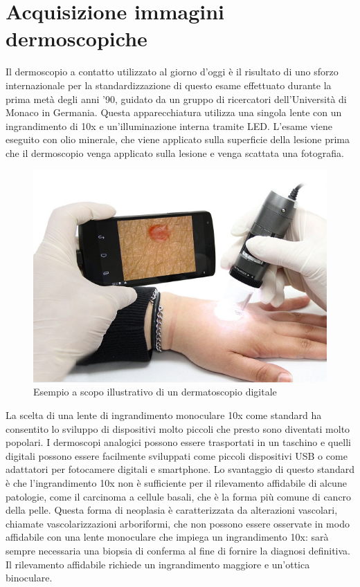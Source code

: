{	\section{Acquisizione immagini dermoscopiche}
	Il dermoscopio a contatto utilizzato al giorno d'oggi è il risultato di uno sforzo internazionale per la standardizzazione di questo esame effettuato durante la prima metà degli anni '90, guidato da un gruppo di ricercatori dell'Università di Monaco in Germania. Questa apparecchiatura utilizza una singola lente con un ingrandimento di 10x e un'illuminazione interna tramite LED. L'esame viene eseguito con olio minerale, che viene applicato sulla superficie della lesione prima che il dermoscopio venga applicato sulla lesione e venga scattata una fotografia.
	\begin{figure}[h]
		\begin{center}     
			\includegraphics[scale=0.30]{figure/capitolo2/dermatoscopio.png}
		\end{center}
		\caption{Esempio a scopo illustrativo di un dermatoscopio digitale}	
	\end{figure}
	La scelta di una lente di ingrandimento monoculare 10x come standard ha consentito lo sviluppo di dispositivi molto piccoli che presto sono diventati molto popolari.
	\newline
	I dermoscopi analogici possono essere trasportati in un taschino e quelli digitali possono essere facilmente sviluppati come piccoli dispositivi USB o come adattatori per fotocamere digitali e smartphone.
	\newline
	Lo svantaggio di questo standard è che l'ingrandimento 10x non è sufficiente per il rilevamento affidabile di alcune patologie, come il carcinoma a cellule basali, che è la forma più comune di cancro della pelle. 
	\newline
	Questa forma di neoplasia è caratterizzata da alterazioni vascolari, chiamate vascolarizzazioni arboriformi, che non possono essere osservate in modo affidabile con una lente monoculare che impiega un ingrandimento 10x: sarà sempre necessaria una biopsia di conferma al fine di fornire la diagnosi definitiva.
	\newline
	Il rilevamento affidabile richiede un ingrandimento maggiore e un'ottica binoculare.
	\cite{rajpara2009systematic}

}
